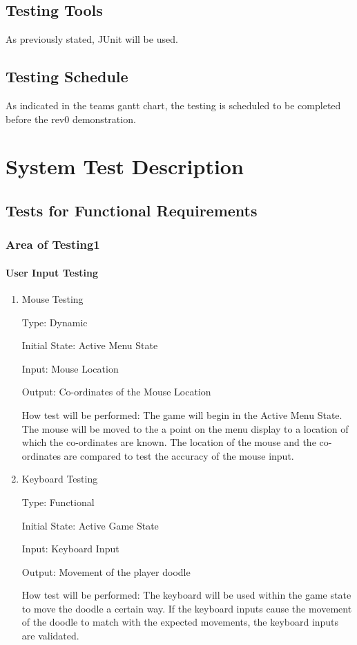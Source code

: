 \documentclass[12pt, titlepage]{article}
\begin{document}
\subsection{Testing Tools}

As previously stated, JUnit will be used. 

\subsection{Testing Schedule}
		
As indicated in the teams gantt chart, the testing is scheduled to be completed before the rev0 demonstration.

\section{System Test Description}
	
\subsection{Tests for Functional Requirements}

\subsubsection{Area of Testing1}
		
\paragraph{User Input Testing}

\begin{enumerate}

\item{Mouse Testing\\}

Type: Dynamic
					
Initial State: Active Menu State
					
Input: Mouse Location
					
Output: Co-ordinates of the Mouse Location
					
How test will be performed: The game will begin in the Active Menu State. The mouse will be moved to the a point on the menu display to a location of which the co-ordinates are known. The location of the mouse and the co-ordinates are compared to test the accuracy of the mouse input. 
					
\item{Keyboard Testing\\}

Type: Functional
					
Initial State: Active Game State
					
Input: Keyboard Input
					
Output: Movement of the player doodle
					
How test will be performed: The keyboard will be used within the game state to move the doodle a certain way. If the keyboard inputs cause the movement of the doodle to match with the expected movements, the keyboard inputs are validated.

\end{enumerate}
\end{document}
